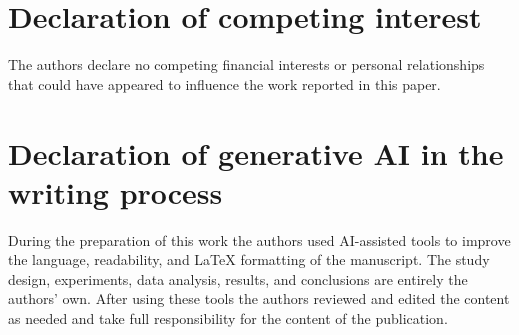 \documentclass[review,12pt]{elsarticle}
\begin{document}
\section*{Declaration of competing interest}
The authors declare no competing financial interests or personal
relationships that could have appeared to influence the work reported in this
paper.

\section*{Declaration of generative AI in the writing process}
During the preparation of this work the authors used AI-assisted tools to
improve the language, readability, and \LaTeX{} formatting of the manuscript.
The study design, experiments, data analysis, results, and conclusions are
entirely the authors' own. After using these tools the authors reviewed and
edited the content as needed and take full responsibility for the content of
the publication.



\end{document}
